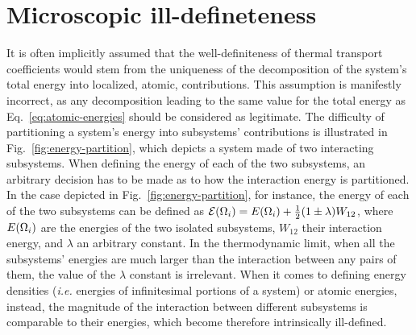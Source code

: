 \section{Microscopic ill-defineteness}

\begin{LEtext}


\end{LEtext}


It is often implicitly assumed that the well-definiteness of thermal transport coefficients would stem from the uniqueness of the decomposition of the system's total energy into localized, atomic, contributions. This assumption is manifestly incorrect, as any decomposition leading to the same value for the total energy as Eq.~\eqref{eq:atomic-energies} should be considered as legitimate. The difficulty of partitioning a system's energy into subsystems' contributions is illustrated in Fig.~\ref{fig:energy-partition}, which depicts a system made of two interacting subsystems. When defining the energy of each of the two subsystems, an arbitrary decision has to be made as to how the interaction energy is partitioned. In the case depicted in Fig.~\ref{fig:energy-partition}, for instance, the energy of each of the two subsystems can be defined as $\mathcal{E}({\mathrm\Omega}_i) = E({\mathrm\Omega}_i) + \frac{1}{2}(1\pm\lambda)W_{12}$, where $E({\mathrm\Omega}_i)$ are the energies of the two isolated subsystems, $W_{12}$ their interaction energy, and $\lambda$ an arbitrary constant. In the thermodynamic limit, when all the subsystems' energies are much larger than the interaction between any pairs of them, the value of the $\lambda$ constant is irrelevant. When it comes to defining energy densities (\emph{i.e.} energies of infinitesimal portions of a system) or atomic energies, instead, the magnitude of the interaction between different subsystems is comparable to their energies, which become therefore intrinsically ill-defined.

